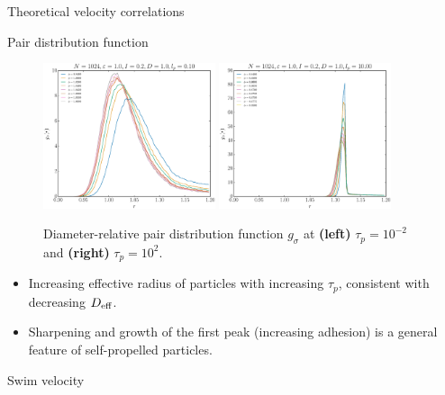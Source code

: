 \documentclass{beamer}
\begin{document}
{\begin{frame}[noframenumbering]{Theoretical velocity correlations}
\end{frame}

\begin{frame}[noframenumbering]{Pair distribution function}

\begin{figure}
\centering
\includegraphics[width=0.45\textwidth]{g_No1024_Tl1000_Rn1000.eps}
\includegraphics[width=0.45\textwidth]{g_No1024_Tl1000_Rj1000.eps}
\caption{Diameter-relative pair distribution function $g_{\sigma}$ at {\bf (left)} $\tau_p=10^{-2}$ and {\bf (right)} $\tau_p = 10^2$.}
\end{figure}

\begin{itemize}
  \item Increasing effective radius of particles with increasing $\tau_p$, consistent with decreasing $D_{\rm eff}$.
  \item Sharpening and growth of the first peak (increasing adhesion) is a general feature of self-propelled particles.
\end{itemize}


\end{frame}

\begin{frame}[noframenumbering]{Swim velocity}


\end{frame}}
\end{document}
